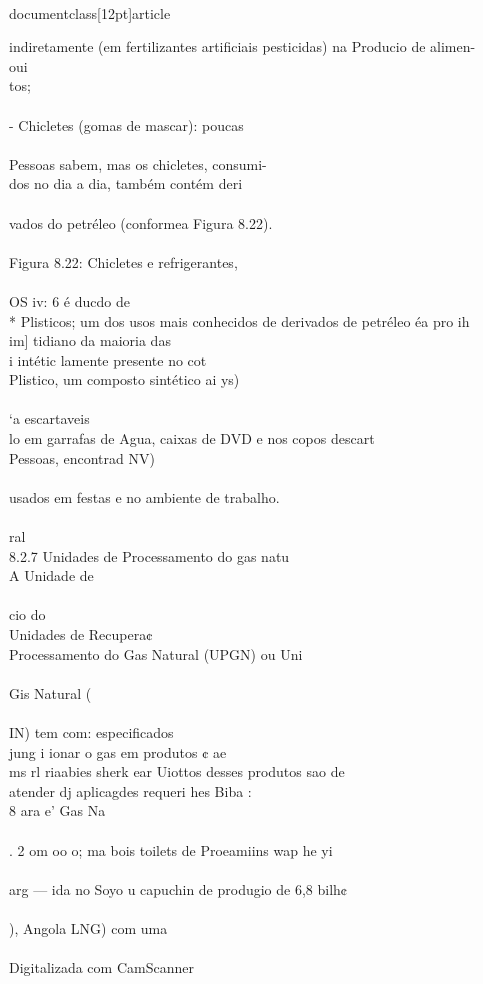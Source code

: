 \\documentclass[12pt]{article}
\begin{document}
indiretamente (em fertilizantes artificiais pesticidas) na Producio de alimen-\\
oui\\
tos;\\
\\
- Chicletes (gomas de mascar): poucas\\
\\
Pessoas sabem, mas os chicletes, consumi-\\
dos no dia a dia, também contém deri\\
\\
vados do petréleo (conformea Figura 8.22).\\
\\
Figura 8.22: Chicletes e refrigerantes,\\
\\
OS iv: 6 é ducdo de\\
* Plisticos; um dos usos mais conhecidos de derivados de petréleo éa pro ih\\
im] tidiano da maioria das\\
i intétic lamente presente no cot\\
Plistico, um composto sintético ai ys)\\
\\
‘a escartaveis\\
lo em garrafas de Agua, caixas de DVD e nos copos descart\\
Pessoas, encontrad NV)\\
\\
usados em festas e no ambiente de trabalho.\\
\\
ral\\
8.2.7 Unidades de Processamento do gas natu\\
A Unidade de\\
\\
cio do\\
Unidades de Recupera¢\\
Processamento do Gas Natural (UPGN) ou Uni\\
\\
Gis Natural (\\
\\
IN) tem com: especificados\\
jung i ionar o gas em produtos ¢ ae\\
ms rl riaabies sherk ear Uiottos desses produtos sao de\\
atender dj aplicagdes requeri hes Biba :\\
8 ara e' Gas Na\\
\\
. 2 om oo o; ma bois toilets de Proeamiins wap he yi\\
\\
arg — ida no Soyo u capuchin de produgio de 6,8 bilh¢\\
\\
), Angola LNG) com uma\\
\\
Digitalizada com CamScanner\\
\end{document}
